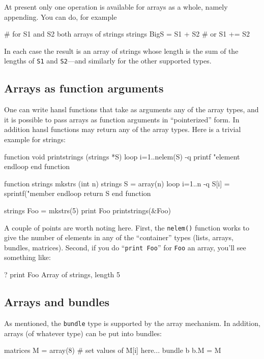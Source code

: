 At present only one operation is available for arrays as a whole,
namely appending. You can do, for example
\begin{code}
# for S1 and S2 both arrays of strings
strings BigS = S1 + S2
# or
S1 += S2
\end{code}
In each case the result is an array of strings whose length is the sum
of the lengths of \texttt{S1} and \texttt{S2}---and similarly for the
other supported types.

\subsection{Arrays as function arguments}
\label{subsec:array-args}

One can write hansl functions that take as arguments any of the array
types, and it is possible to pass arrays as function arguments in
``pointerized'' form. In addition hansl functions may return any of
the array types. Here is a trivial example for strings:
\begin{code}
function void printstrings (strings *S)
  loop i=1..nelem(S) -q
    printf "element %
  endloop
end function

function strings mkstrs (int n)
  strings S = array(n)
  loop i=1..n -q
    S[i] = sprintf("member %
  endloop
  return S
end function

strings Foo = mkstrs(5)
print Foo
printstrings(&Foo)
\end{code}

A couple of points are worth noting here. First, the \texttt{nelem()}
function works to give the number of elements in any of the
``container'' types (lists, arrays, bundles, matrices). Second, if you
do ``\texttt{print Foo}'' for \texttt{Foo} an array, you'll see
something like:
\begin{code}
? print Foo
Array of strings, length 5
\end{code}

\subsection{Arrays and bundles}

As mentioned, the \texttt{bundle} type is supported by the array
mechanism. In addition, arrays (of whatever type) can be put into
bundles:
\begin{code}
matrices M = array(8)
# set values of M[i] here...
bundle b
b.M = M
\end{code}

